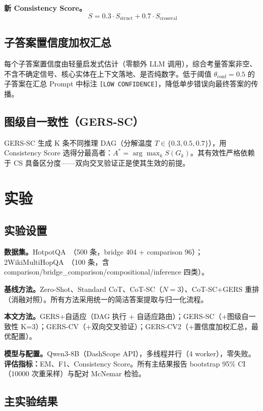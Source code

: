 \documentclass[11pt,a4paper]{ctexart}
\begin{document}
\textbf{新 Consistency Score。}
\begin{equation}
S = 0.3 \cdot S_{\text{struct}} + 0.7 \cdot S_{\text{crossval}}
\end{equation}

\subsection{子答案置信度加权汇总}

每个子答案置信度由轻量启发式估计（零额外 LLM 调用），综合考量答案非空、不含不确定信号、核心实体在上下文落地、是否纯数字。低于阈值 $\theta_{\text{conf}}=0.5$ 的子答案在汇总 Prompt 中标注 \texttt{[LOW CONFIDENCE]}，降低单步错误向最终答案的传播。

\subsection{图级自一致性（GERS-SC）}

GERS-SC 生成 K 条不同推理 DAG（分解温度 $T \in \{0.3, 0.5, 0.7\}$），用 Consistency Score 选得分最高者：$A^* = \arg\max_{k} S(G_k)$。其有效性严格依赖于 CS 具备区分度——双向交叉验证正是使其生效的前提。

\section{实验}

\subsection{实验设置}

\textbf{数据集。}HotpotQA~\cite{yang2018hotpotqa}（500 条，bridge 404 + comparison 96）；2WikiMultiHopQA~\cite{ho20202wiki}（100 条，含 comparison/bridge\_comparison/compositional/inference 四类）。

\textbf{基线方法。}Zero-Shot、Standard CoT、CoT-SC（$N=3$）、CoT-SC+GERS 重排（消融对照）。所有方法采用统一的简洁答案提取与归一化流程。

\textbf{本文方法。}GERS+自适应（DAG 执行 + 自适应路由）；GERS-SC（+图级自一致性 K=3）；GERS-CV（+双向交叉验证）；GERS-CV2（+置信度加权汇总，最优配置）。

\textbf{模型与配置。}Qwen3-8B（DashScope API），多线程并行（4 worker），零失败。\textbf{评估指标：}EM、F1、Consistency Score。所有主结果报告 bootstrap 95\% CI（10000 次重采样）与配对 McNemar 检验。

\subsection{主实验结果}
\end{document}
